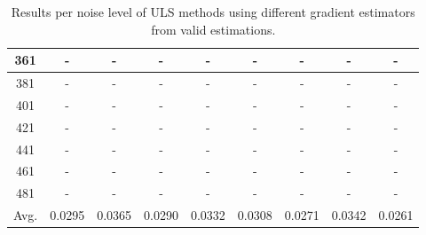 \begin{table}[ht!]
\begin{tabular}{c|c|c|c|c|c|c|c|c}
361 & - & - & - & - & - & - & - & - \\ \hline
381 & - & - & - & - & - & - & - & - \\ \hline
401 & - & - & - & - & - & - & - & - \\ \hline
421 & - & - & - & - & - & - & - & - \\ \hline
441 & - & - & - & - & - & - & - & - \\ \hline
461 & - & - & - & - & - & - & - & - \\ \hline
481 & - & - & - & - & - & - & - & - \\ \hline
Avg.  & 0.0295 & 0.0365 & 0.0290 & 0.0332 & 0.0308 & 0.0271 & 0.0342 & 0.0261 \\ \hline
\end{tabular}
\caption{Results per noise level of ULS methods using different gradient estimators from valid estimations.}
\label{tab:ULSperNoiseValid}
\end{table}


